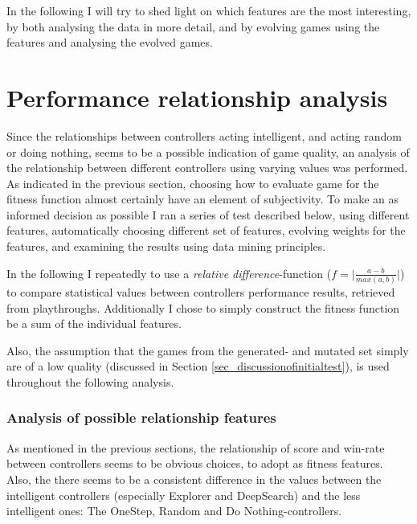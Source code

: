 \documentclass[a4paper,titlepage,final]{report}
\begin{document}
In the following I will try to shed light on which features are the most interesting, by both analysing the data in more detail, and by evolving games using the features and analysing the evolved games.



\section{Performance relationship analysis}
\label{sec_task2fitnessSelection}
Since the relationships between controllers acting intelligent, and acting random or doing nothing, seems to be a possible indication of game quality, an analysis of the relationship between different controllers using varying values was performed.
As indicated in the previous section, choosing how to evaluate game for the fitness function almost certainly have an element of  subjectivity. 
To make an as informed decision as possible I ran a series of test described below, using different features, automatically choosing different set of features, evolving weights for the features, and examining the results using data mining principles.

In the following I repeatedly to use a \textit{relative difference}-function ($f=\lvert\frac{a-b}{max(a,b)}\rvert$) to compare statistical values  between controllers performance results, retrieved from playthroughs.
Additionally I chose to simply construct the fitness function be a sum of the individual features.

Also, the assumption that the games from the generated- and mutated set simply are of a low quality (discussed in Section \ref{sec_discussionofinitialtest}), is used throughout the following analysis.

\subsubsection*{Analysis of possible relationship features}
As mentioned in the previous sections, the relationship of score and win-rate between controllers seems to be obvious choices, to adopt as fitness features.
Also, the there seems to be a consistent difference in the values between the intelligent controllers (especially Explorer and DeepSearch) and the less intelligent ones: The OneStep, Random and Do Nothing-controllers.
\end{document}
